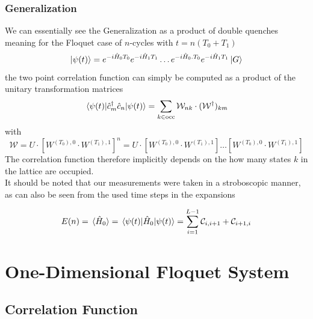 \documentclass[11pt, a4paper]{article}
\theoremstyle{definition} %
\begin{document}
	\subsubsection{Generalization}
	We can essentially see the Generalization as a product of double quenches meaning for the Floquet case of $n$-cycles with $t = n(T_0 + T_1)$
	\begin{equation}
		\ket{\psi(t)} = e^{-i \hat{H}_0 T_0} e^{-i \hat{H}_1 T_1} \dots e^{-i \hat{H}_0. T_0 } e^{-i \hat{H}_1 T_1} \ket{G}
	\end{equation}
	the two point correlation function can simply be computed as a product of the unitary transformation matrices
	\begin{equation}
		\mel{\psi(t)}{\hat{c}_m^\dagger \hat{c}_n }{\psi(t)} = \sum_{k \in \text{occ}} \mathcal{W}_{nk}  \cdot (\mathcal{W}^\dagger)_{km}
	\end{equation}
	with 
	\begin{equation}
		\mathcal{W} = U \cdot [W^{(T_0),0} \cdot W^{(T_1), 1}]^n = U \cdot [ W^{(T_0),0} \cdot W^{(T_1), 1}] \dots [ W^{(T_0), 0} \cdot W^{(T_1), 1}] 
	\end{equation}
	The correlation function therefore implicitly depends on the how many states $k$ in the lattice are occupied. \\
	
	It should be noted that our measurements were taken in a stroboscopic manner, as can also be seen from the used time steps in the expansions


\begin{equation}
	E(n) =\expval*{\hat{H}_0} = \mel{\psi(t)}{\hat{H}_0}{\psi(t)} = \sum_{i=1}^{L-1} \mathcal{C}_{i, i+1} + \mathcal{C}_{i+1, i}
\end{equation}
	
	\section{One-Dimensional Floquet System}
	
	\subsection{Correlation Function}
	
\end{document}
